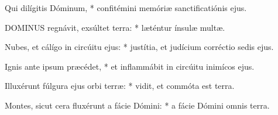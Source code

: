 
 Qui dilígitis Dóminum, * confitémini memóriæ sanctificatiónis ejus.


\lettrine[lines=2]{D}{OMINUS} regnávit, exsúltet terra: * læténtur ínsulæ multæ.

Nubes, et cálígo in circúitu ejus: * justítia, et judícium corréctio sedis ejus.

Ignis ante ipsum præcédet, * et inflammábit in circúitu inimícos ejus.

Illuxérunt fúlgura ejus orbi terræ: * vidit, et commóta est terra.

Montes, sicut cera fluxérunt a fácie Dómini: * a fácie Dómini omnis terra.

